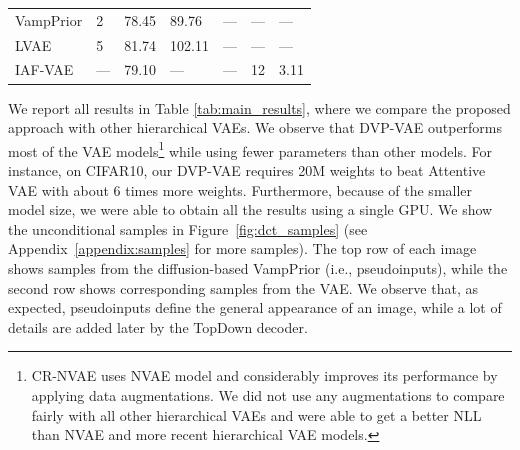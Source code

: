 \begin{table}[t]
{\begin{tabular}{l||lll|lll}
            VampPrior \small{\citep{tomczak2018vae}} & \multirow{1}{*}{2}
                    & \multirow{1}{*}{78.45}  &   \multirow{1}{*}{89.76}             
                    & --- & --- & --- \\
            LVAE \small{\citep{sonderby2016ladder}} & \multirow{1}{*}{5}
                    & \multirow{1}{*}{81.74} & \multirow{1}{*}{102.11}     
                    & --- & --- & --- \\
            IAF-VAE\small{\citep{kingma2016improved}} & \multirow{1}{*}{---}
                    & \multirow{1}{*}{79.10}  &   \multirow{1}{*}{---}             
                    & --- & 12 & 3.11 \\
            \bottomrule
        \end{tabular}%
        }
 \end{table} 
We report all results in Table \ref{tab:main_results}, where we compare the proposed approach with other hierarchical VAEs. 
We observe that DVP-VAE outperforms most of the VAE models\footnote{CR-NVAE \citep{sinha2021consistency} uses NVAE model and considerably improves its performance by applying data augmentations. We did not use any augmentations to compare fairly with all other hierarchical VAEs and were able to get a better NLL than NVAE and more recent hierarchical VAE models.
} while using fewer parameters than other models. For instance, on CIFAR10, our DVP-VAE requires 20M weights to beat Attentive VAE with about 6 times more weights.
Furthermore, because of the smaller model size, we were able to obtain all the results using a single GPU. 
We show the unconditional samples in Figure~\ref{fig:dct_samples} (see Appendix~\ref{appendix:samples} for more samples). 
The top row of each image shows samples from the diffusion-based VampPrior (i.e., pseudoinputs), while the second row shows corresponding samples from the VAE. 
We observe that, as expected, pseudoinputs define the general appearance of an image, while a lot of details are added later by the TopDown decoder. 
